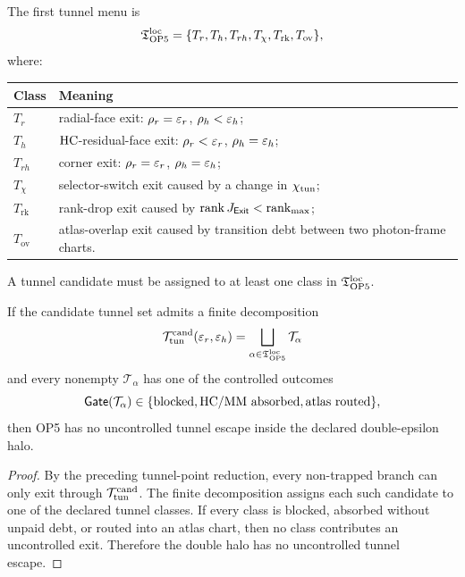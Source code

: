 \begin{definition}
The first tunnel menu is
\[
\mathfrak T_{\mathrm{OP}5}^{\mathrm{loc}}
=
\{T_r,T_h,T_{rh},T_\chi,T_{\mathrm{rk}},T_{\mathrm{ov}}\},
\]
where:
\begin{center}
\begin{tabular}{>{\raggedright\arraybackslash}p{2.4cm} >{\raggedright\arraybackslash}p{9.4cm}}
\toprule
Class & Meaning \\
\midrule
\(T_r\) & radial-face exit: \(\rho_r=\varepsilon_r\), \(\rho_h<\varepsilon_h\); \\
\(T_h\) & \(\mathrm{HC}\)-residual-face exit: \(\rho_r<\varepsilon_r\), \(\rho_h=\varepsilon_h\); \\
\(T_{rh}\) & corner exit: \(\rho_r=\varepsilon_r\), \(\rho_h=\varepsilon_h\); \\
\(T_\chi\) & selector-switch exit caused by a change in \(\chi_{\mathrm{tun}}\); \\
\(T_{\mathrm{rk}}\) & rank-drop exit caused by \(\operatorname{rank}J_{\mathsf{Exit}}<\operatorname{rank}_{\max}\); \\
\(T_{\mathrm{ov}}\) & atlas-overlap exit caused by transition debt between two photon-frame charts. \\
\bottomrule
\end{tabular}
\end{center}
A tunnel candidate must be assigned to at least one class in \(\mathfrak T_{\mathrm{OP}5}^{\mathrm{loc}}\).
\end{definition}

\begin{proposition}
If the candidate tunnel set admits a finite decomposition
\[
\mathcal T_{\mathrm{tun}}^{\mathrm{cand}}(\varepsilon_r,\varepsilon_h)
=
\bigsqcup_{\alpha\in\mathfrak T_{\mathrm{OP}5}^{\mathrm{loc}}}
\mathcal T_\alpha
\]
and every nonempty \(\mathcal T_\alpha\) has one of the controlled outcomes
\[
\Gate(\mathcal T_\alpha)
\in
\{\mathrm{blocked},\mathrm{HC/MM\ absorbed},\mathrm{atlas\ routed}\},
\]
then OP5 has no uncontrolled tunnel escape inside the declared double-epsilon halo.
\end{proposition}

\begin{proof}
By the preceding tunnel-point reduction, every non-trapped branch can only exit through \(\mathcal T_{\mathrm{tun}}^{\mathrm{cand}}\). The finite decomposition assigns each such candidate to one of the declared tunnel classes. If every class is blocked, absorbed without unpaid debt, or routed into an atlas chart, then no class contributes an uncontrolled exit. Therefore the double halo has no uncontrolled tunnel escape.
\end{proof}

